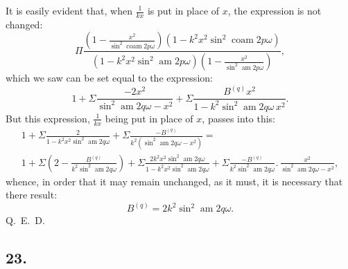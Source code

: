 \documentclass{article}
\begin{document}
It is easily evident that, when $\frac{1}{kx}$ is put in place of $x$, the expression is not changed:
\[
\Pi\frac{\left(1-\frac{x^{2}}{\sin^{2}\operatorname{coam}2p\omega}\right)\left(1-k^{2}x^{2}\sin^{2}\operatorname{coam}2p\omega\right)}{\left(1-k^{2}x^{2}\sin^{2}\operatorname{am}2p\omega\right)\left(1-\frac{x^{2}}{\sin^{2}\operatorname{am}2p\omega}\right)},
\]
which we saw can be set equal to the expression:
\[
1+\Sigma\frac{-2x^{2}}{\sin^{2}\operatorname{am}2q\omega-x^{2}}+\Sigma\frac{B^{(q)}x^{2}}{1-k^{2}\sin^{2}\operatorname{am}2q\omega\,x^{2}}.
\]
But this expression, $\frac{1}{kx}$ being put in place of $x$, passes into this:
\[
\begin{gathered}
1+\Sigma\frac{2}{1-k^{2}x^{2}\sin^{2}\operatorname{am}2q\omega}+\Sigma\frac{-B^{(q)}}{k^{2}\left(\sin^{2}\operatorname{am}2q\omega-x^{2}\right)}=\\[1.5ex]
1+\Sigma\left(2-\frac{B^{(q)}}{k^{2}\sin^{2}\operatorname{am}2q\omega}\right)+\Sigma\frac{2k^{2}x^{2}\sin^{2}\operatorname{am}2q\omega}{1-k^{2}x^{2}\sin^{2}\operatorname{am}2q\omega}+\Sigma\frac{-B^{(q)}}{k^{2}\sin^{2}\operatorname{am}2q\omega}.\,\frac{x^{2}}{\sin^{2}\operatorname{am}2q\omega-x^{2}},
\end{gathered}
\]
whence, in order that it may remain unchanged, as it must, it is necessary that there result:
\[
B^{(q)}=2k^{2}\sin^{2}\operatorname{am}2q\omega.
\]
Q.\ E.\ D.

\subsection*{23.}
\end{document}
